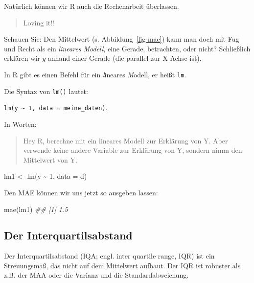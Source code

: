 \documentclass[
  letterpaper,
]{scrbook}
\newenvironment{Shaded}{\begin{snugshade}}{\end{snugshade}}
\newcommand{\AttributeTok}[1]{\textcolor[rgb]{0.40,0.45,0.13}{#1}}
\newcommand{\DecValTok}[1]{\textcolor[rgb]{0.68,0.00,0.00}{#1}}
\newcommand{\DocumentationTok}[1]{\textcolor[rgb]{0.37,0.37,0.37}{\textit{#1}}}
\newcommand{\FunctionTok}[1]{\textcolor[rgb]{0.28,0.35,0.67}{#1}}
\newcommand{\NormalTok}[1]{\textcolor[rgb]{0.00,0.23,0.31}{#1}}
\newcommand{\OtherTok}[1]{\textcolor[rgb]{0.00,0.23,0.31}{#1}}
\newcommand{\SpecialCharTok}[1]{\textcolor[rgb]{0.37,0.37,0.37}{#1}}
\theoremstyle{definition}
\theoremstyle{definition}
\theoremstyle{definition}
\theoremstyle{remark}
\begin{document}
Natürlich können wir R auch die Rechenarbeit überlassen.

\begin{quote}
{} Loving it!!
\end{quote}

Schauen Sie: Den Mittelwert (s. Abbildung~\ref{fig-mae}) kann man doch
mit Fug und Recht als ein \emph{lineares Modell}, eine Gerade,
betrachten, oder nicht? Schließlich erklären wir \(y\) anhand einer
Gerade (die parallel zur X-Achse ist).

In R gibt es einen Befehl für ein \emph{l}ineares \emph{M}odell, er
heißt \texttt{lm}.

Die Syntax von \texttt{lm()} lautet:

\texttt{lm(y\ \textasciitilde{}\ 1,\ data\ =\ meine\_daten)}.

In Worten:

\begin{quote}
Hey R, berechne mit ein lineares Modell zur Erklärung von Y. Aber
verwende keine andere Variable zur Erklärung von Y, sondern nimm den
Mittelwert von Y.
\end{quote}

\begin{Shaded}
\begin{Highlighting}[]
\NormalTok{lm1 }\OtherTok{\textless{}{-}} \FunctionTok{lm}\NormalTok{(y }\SpecialCharTok{\textasciitilde{}} \DecValTok{1}\NormalTok{, }\AttributeTok{data =}\NormalTok{ d)}
\end{Highlighting}
\end{Shaded}

Den MAE können wir uns jetzt so ausgeben lassen:

\begin{Shaded}
\begin{Highlighting}[]
\FunctionTok{mae}\NormalTok{(lm1)}
\DocumentationTok{\#\# [1] 1.5}
\end{Highlighting}
\end{Shaded}

\subsection{Der Interquartilsabstand}\label{der-interquartilsabstand}

Der Interquartilsabstand (IQA; engl. inter quartile range, IQR) ist ein
Streuungsmaß, das nicht auf dem Mittelwert aufbaut. Der IQR ist robuster
als z.B. der MAA oder die Varianz und die Standardabweichung.
\end{document}
